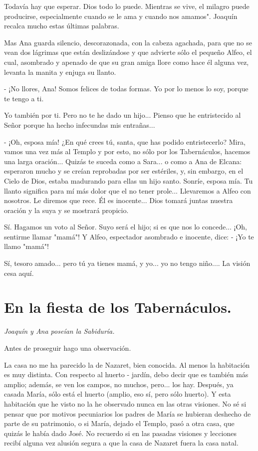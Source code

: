 \documentclass[12pt]{book} %
\begin{document}
Todavía hay que esperar. Dios todo lo puede. Mientras se vive, el milagro puede producirse, especialmente cuando se le ama y cuando nos amamos". Joaquín recalca mucho estas últimas palabras. 

Mas Ana guarda silencio, descorazonada, con la cabeza agachada, para que no se vean dos lágrimas que están deslizándose y que advierte sólo el pequeño Alfeo, el cual, asombrado y apenado de que su gran amiga llore como hace él alguna vez, levanta la manita y enjuga su llanto. 

- ¡No llores, Ana! Somos felices de todas formas. Yo por lo menos lo soy, porque te tengo a ti. 

Yo también por ti. Pero no te he dado un hijo... Pienso que he entristecido al Señor porque ha hecho infecundas mis entrañas... 

- ¡Oh, esposa mía! ¿En qué crees tú, santa, que has podido entristecerlo? Mira, vamos una vez más al Templo y por esto, no sólo por los Tabernáculos, hacemos una larga oración... Quizás te suceda como a Sara... o como a Ana de Elcana: esperaron mucho y se creían reprobadas por ser estériles, y, sin embargo, en el Cielo de Dios, estaba madurando para ellas un hijo santo. Sonríe, esposa mía. Tu llanto significa para mí más dolor que el no tener prole... Llevaremos a Alfeo con nosotros. Le diremos que rece. Él es inocente... Dios tomará juntas nuestra oración y la suya y se mostrará propicio. 

Sí. Hagamos un voto al Señor. Suyo será el hijo; si es que nos lo concede... ¡Oh, sentirme llamar "mamá"! Y Alfeo, espectador asombrado e inocente, dice: 
- ¡Yo te llamo "mamá"! 

Sí, tesoro amado... pero tú ya tienes mamá, y yo... yo no tengo niño.... La visión cesa aquí. 

\chapter{En la fiesta de los Tabernáculos.}
\emph{Joaquín y Ana poseían la Sabiduría.}
 
Antes de proseguir hago una observación. 

La casa no me ha parecido la de Nazaret, bien conocida. Al menos la habitación es muy distinta. Con respecto al huerto - jardín, debo decir que es también más amplio; además, se ven los campos, no muchos, pero... los hay. Después, ya casada María, sólo está el huerto (amplio, eso sí, pero sólo huerto). Y esta habitación que he visto no la he observado nunca en las otras visiones. No sé si pensar que por motivos pecuniarios los padres de María se hubieran deshecho de parte de su patrimonio, o si María, dejado el Templo, pasó a otra casa, que quizás le había dado José. No recuerdo si en las pasadas visiones y lecciones recibí alguna vez alusión segura a que la casa de Nazaret fuera la casa natal. 
\end{document}
